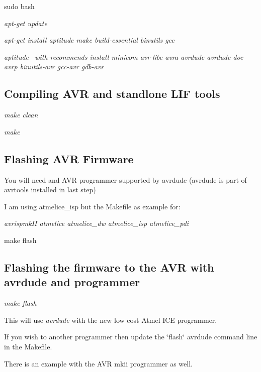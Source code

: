 \begin{DoxyItemize}
\item sudo bash
\item {\itshape apt-\/get update}
\item {\itshape apt-\/get install aptitude make build-\/essential binutils gcc}
\item {\itshape aptitude --with-\/recommends install minicom avr-\/libc avra avrdude avrdude-\/doc avrp binutils-\/avr gcc-\/avr gdb-\/avr}
\end{DoxyItemize}

\subsection*{Compiling A\+VR and standlone L\+IF tools}


\begin{DoxyItemize}
\item {\itshape make clean}
\item {\itshape make}
\end{DoxyItemize}

\subsection*{Flashing A\+VR Firmware}


\begin{DoxyItemize}
\item You will need and A\+VR programmer supported by avrdude (avrdude is part of avrtools installed in last step)
\begin{DoxyItemize}
\item I am using atmelice\+\_\+isp but the Makefile as example for\+:
\begin{DoxyItemize}
\item {\itshape avrispmk\+II atmelice atmelice\+\_\+dw atmelice\+\_\+isp atmelice\+\_\+pdi}
\end{DoxyItemize}
\end{DoxyItemize}
\item make flash
\end{DoxyItemize}

\subsection*{Flashing the firmware to the A\+VR with avrdude and programmer}


\begin{DoxyItemize}
\item {\itshape make flash}
\begin{DoxyItemize}
\item This will use {\itshape avrdude} with the new low cost Atmel I\+CE programmer.
\begin{DoxyItemize}
\item If you wish to another programmer then update the \char`\"{}flash\char`\"{} avrdude command line in the Makefile.
\item There is an example with the A\+VR mkii programmer as well.
\end{DoxyItemize}
\end{DoxyItemize}
\end{DoxyItemize}

